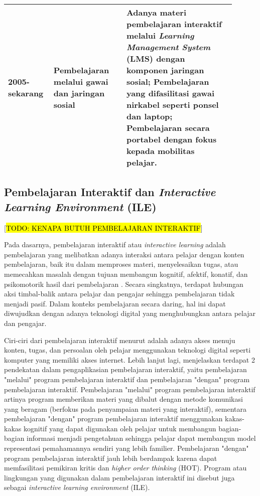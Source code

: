 \begin{longtable}{ |p{0.15\linewidth}|p{0.3\linewidth}|p{0.45\linewidth}| }
  \hline
  2005- sekarang & Pembelajaran melalui gawai dan jaringan sosial                       & Adanya materi pembelajaran interaktif melalui \textit{Learning Management System} (LMS) dengan komponen jaringan sosial; Pembelajaran yang difasilitasi gawai nirkabel seperti ponsel dan laptop; Pembelajaran secara portabel dengan fokus kepada mobilitas pelajar. \\
  \hline
\end{longtable}

\subsection{Pembelajaran Interaktif dan \textit{Interactive Learning Environment} (ILE)}
[\hl{TODO: KENAPA BUTUH PEMBELAJARAN INTERAKTIF}]

Pada dasarnya, pembelajaran interaktif atau \textit{interactive learning} adalah pembelajaran yang melibatkan adanya interaksi antara pelajar dengan konten pembelajaran, baik itu dalam memproses materi, menyelesaikan tugas, atau memecahkan masalah dengan tujuan membangun kognitif, afektif, konatif, dan psikomotorik hasil dari pembelajaran \parencite{reeves2012interactive}. Secara singkatnya, terdapat hubungan aksi timbal-balik antara pelajar dan pengajar sehingga pembelajaran tidak menjadi pasif. Dalam konteks pembelajaran secara daring, hal ini dapat diwujudkan dengan adanya teknologi digital yang menghubungkan antara pelajar dan pengajar.

Ciri-ciri dari pembelajaran interaktif menurut \textcite{reeves2012interactive} adalah adanya akses menuju konten, tugas, dan persoalan oleh pelajar menggunakan teknologi digital seperti komputer yang memiliki akses internet. Lebih lanjut lagi, \textcite{reeves2012interactive} menjelaskan terdapat 2 pendekatan dalam pengaplikasian pembelajaran interaktif, yaitu pembelajaran "melalui" program pembelajaran interaktif dan pembelajaran "dengan" program pembelajaran interaktif. Pembelajaran "melalui" program pembelajaran interaktif artinya program memberikan materi yang dibalut dengan metode komunikasi yang beragam (berfokus pada penyampaian materi yang interaktif), sementara pembelajaran "dengan" program pembelajaran interaktif menggunakan kakas-kakas kognitif yang dapat digunakan oleh pelajar untuk membangun bagian-bagian informasi menjadi pengetahuan sehingga pelajar dapat membangun model representasi pemahamannya sendiri yang lebih familier. Pembelajaran "dengan" program pembelajaran interaktif jauh lebih berdampak karena dapat memfasilitasi pemikiran kritis dan \textit{higher order thinking} (HOT). Program atau lingkungan yang digunakan dalam pembelajaran interaktif ini disebut juga sebagai \textit{interactive learning environment} (ILE).

